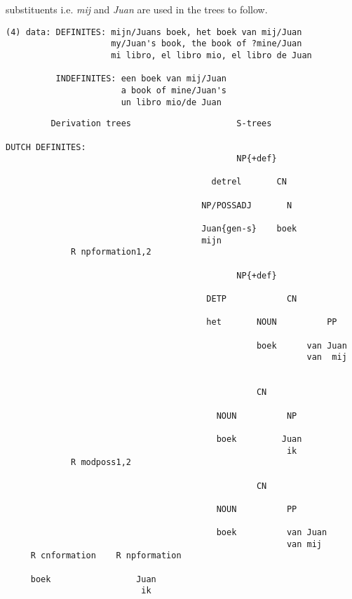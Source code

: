 substituents i.e. {\em mij} and {\em Juan} are used in the trees to follow.
\begin{verbatim}
(4) data: DEFINITES: mijn/Juans boek, het boek van mij/Juan
                     my/Juan's book, the book of ?mine/Juan 
                     mi libro, el libro mio, el libro de Juan

          INDEFINITES: een boek van mij/Juan
                       a book of mine/Juan's
                       un libro mio/de Juan
\end{verbatim}
\newpage
\begin{verbatim}
         Derivation trees                     S-trees      

DUTCH DEFINITES:
                                              NP{+def}

                                         detrel       CN

                                       NP/POSSADJ       N

                                       Juan{gen-s}    boek
                                       mijn
             R npformation1,2

                                              NP{+def}

                                        DETP            CN

                                        het       NOUN          PP

                                                  boek      van Juan
                                                            van  mij


                                                  CN
                                            
                                          NOUN          NP

                                          boek         Juan              
                                                        ik
             R modposs1,2

                                                  CN

                                          NOUN          PP

                                          boek          van Juan
                                                        van mij
     R cnformation    R npformation

     boek                 Juan                           
                           ik
\end{verbatim}
